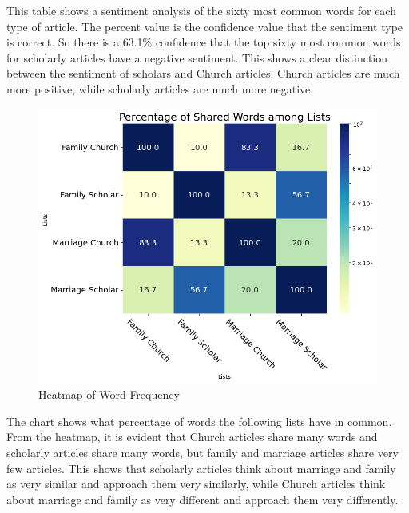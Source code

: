 \documentclass[twocolumn]{article}
\begin{document}
This table shows a sentiment analysis of the sixty most common words for each type of article. The percent value is the confidence value that the sentiment type is correct. So there is a 63.1\% confidence that the top sixty most common words for scholarly articles have a negative sentiment. This shows a clear distinction between the sentiment of scholars and Church articles. Church articles are much more positive, while scholarly articles are much more negative.
\begin{figure}[h]
    \centering
    \includegraphics[width=\linewidth]{../heatmap.png}
    \caption{Heatmap of Word Frequency}
    \label{fig:heatmap}
\end{figure}

The chart shows what percentage of words the following lists have in common. From the heatmap, it is evident that Church articles share many words and scholarly articles share many words, but family and marriage articles share very few articles. This shows that scholarly articles think about marriage and family as very similar and approach them very similarly, while Church articles think about marriage and family as very different and approach them very differently.

\end{document}
